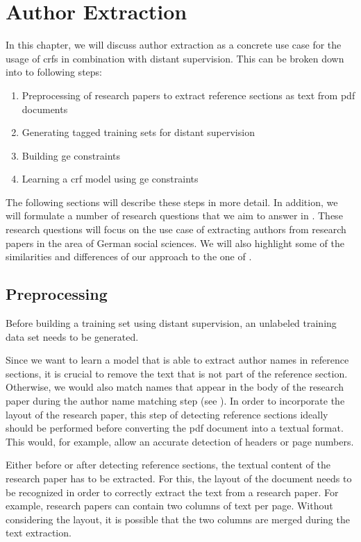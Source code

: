\chapter{Author Extraction}\label{cha:author-extraction}

In this chapter, we will discuss author extraction as a concrete use case for the usage of \glspl{crf} in combination with \gls{distant supervision}.
This can be broken down into to following steps:
\begin{enumerate}
  \item Preprocessing of research papers to extract reference sections as text from \gls{pdf} documents
  \item Generating tagged training sets for distant supervision
  \item Building \gls{ge} constraints
  \item Learning a \gls{crf} model using \gls{ge} constraints
\end{enumerate}
The following sections will describe these steps in more detail.
In addition, we will formulate a number of research questions that we aim to answer in .
These research questions will focus on the use case of extracting authors from research papers in the area of German social sciences.
We will also highlight some of the similarities and differences of our approach to the one of \citet{lu2013web}.

\section{Preprocessing}\label{sec:ae-preprocessing}

Before building a training set using \gls{distant supervision}, an unlabeled training data set needs to be generated.

Since we want to learn a model that is able to extract author names in reference sections, it is crucial to remove the text that is not part of the reference section.
Otherwise, we would also match names that appear in the body of the research paper during the author name matching step (see ).
In order to incorporate the layout of the research paper, this step of detecting reference sections ideally should be performed before converting the \gls{pdf} document into a textual format.
This would, for example, allow an accurate detection of headers or page numbers.

\bigskip

Either before or after detecting reference sections, the textual content of the research paper has to be extracted.
For this, the layout of the document needs to be recognized in order to correctly extract the text from a research paper.
For example, research papers can contain two columns of text per page.
Without considering the layout, it is possible that the two columns are merged during the text extraction.


